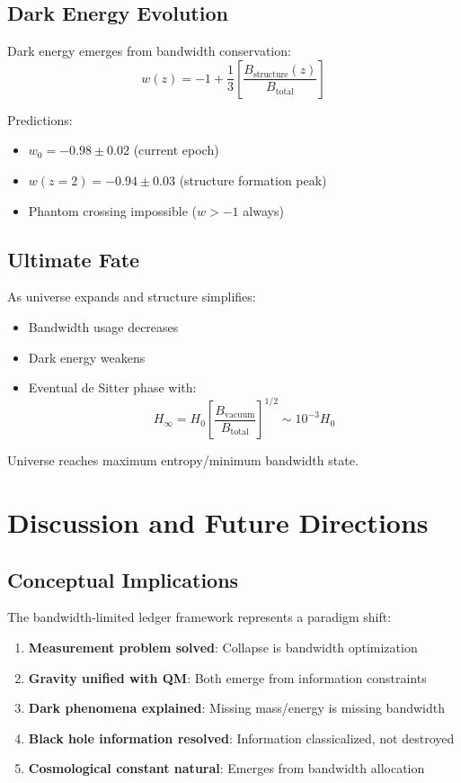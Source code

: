 \documentclass[twocolumn,prd,amsmath,amssymb,aps,superscriptaddress,nofootinbib]{revtex4-2}
\begin{document}
\subsection{Dark Energy Evolution}

Dark energy emerges from bandwidth conservation:
\begin{equation}
w(z) = -1 + \frac{1}{3}\left[\frac{B_{\text{structure}}(z)}{B_{\text{total}}}\right]
\end{equation}

Predictions:
\begin{itemize}
\item $w_0 = -0.98 \pm 0.02$ (current epoch)
\item $w(z=2) = -0.94 \pm 0.03$ (structure formation peak)
\item Phantom crossing impossible ($w > -1$ always)
\end{itemize}

\subsection{Ultimate Fate}

As universe expands and structure simplifies:
\begin{itemize}
\item Bandwidth usage decreases
\item Dark energy weakens
\item Eventual de Sitter phase with:
\begin{equation}
H_\infty = H_0\left[\frac{B_{\text{vacuum}}}{B_{\text{total}}}\right]^{1/2} \sim 10^{-3} H_0
\end{equation}
\end{itemize}

Universe reaches maximum entropy/minimum bandwidth state.

\section{Discussion and Future Directions}
\label{sec:discussion}

\subsection{Conceptual Implications}

The bandwidth-limited ledger framework represents a paradigm shift:

\begin{enumerate}
\item \textbf{Measurement problem solved}: Collapse is bandwidth optimization
\item \textbf{Gravity unified with QM}: Both emerge from information constraints
\item \textbf{Dark phenomena explained}: Missing mass/energy is missing bandwidth
\item \textbf{Black hole information resolved}: Information classicalized, not destroyed
\item \textbf{Cosmological constant natural}: Emerges from bandwidth allocation
\end{enumerate}
\end{document}
